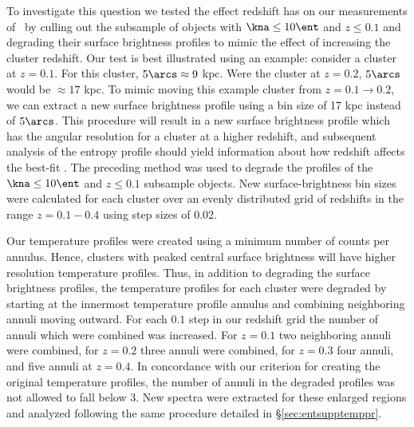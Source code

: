 To investigate this question we tested the effect redshift has on our
measurements of \kna\ by culling out the subsample of objects with
$\kna \leq 10 \ent$ and $z \leq 0.1$ and degrading their surface
brightness profiles to mimic the effect of increasing the cluster
redshift. Our test is best illustrated using an example: consider a
cluster at $z = 0.1$. For this cluster, $5\arcs \approx 9$ kpc. Were
the cluster at $z = 0.2$, $5\arcs$ would be $\approx 17$ kpc. To mimic
moving this example cluster from $z = 0.1 \rightarrow 0.2$, we can
extract a new surface brightness profile using a bin size of 17 kpc
instead of $5\arcs$. This procedure will result in a new surface
brightness profile which has the angular resolution for a cluster at a
higher redshift, and subsequent analysis of the entropy profile should
yield information about how redshift affects the best-fit \kna. The
preceding method was used to degrade the profiles of the $\kna \leq 10
\ent$ and $z \leq 0.1$ subsample objects. New surface-brightness bin
sizes were calculated for each cluster over an evenly distributed grid
of redshifts in the range $z = 0.1-0.4$ using step sizes of 0.02.

Our temperature profiles were created using a minimum number of counts
per annulus. Hence, clusters with peaked central surface brightness
will have higher resolution temperature profiles. Thus, in addition to
degrading the surface brightness profiles, the temperature profiles
for each cluster were degraded by starting at the innermost
temperature profile annulus and combining neighboring annuli moving
outward. For each $0.1$ step in our redshift grid the number of annuli
which were combined was increased. For $z=0.1$ two neighboring annuli
were combined, for $z=0.2$ three annuli were combined, for $z=0.3$
four annuli, and five annuli at $z=0.4$. In concordance with our
criterion for creating the original temperature profiles, the number
of annuli in the degraded profiles was not allowed to fall below
3. New spectra were extracted for these enlarged regions and analyzed
following the same procedure detailed in \S\ref{sec:entsupptemppr}.

